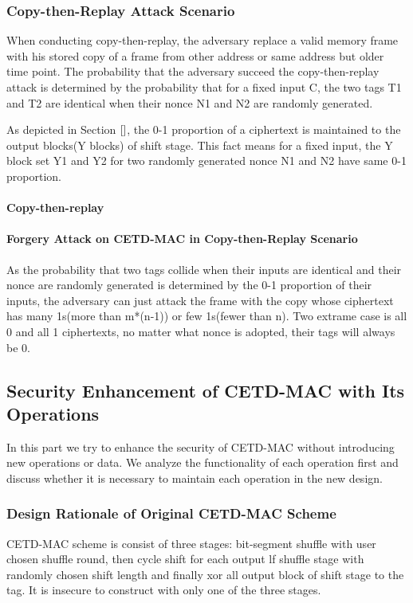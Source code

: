 \subsubsection{Copy-then-Replay Attack Scenario}
When conducting copy-then-replay, the adversary replace a valid memory frame with his stored copy of a frame from other address or same address but older time point. The probability that the adversary succeed the copy-then-replay attack is determined by the probability that for a fixed input C, the two tags T1 and T2 are identical when their nonce N1 and N2 are randomly generated.

As depicted in Section $\ref{}$, the 0-1 proportion of a ciphertext is maintained to the output blocks(Y blocks) of shift stage. This fact means for a fixed input, the Y block set Y1 and Y2 for two randomly generated nonce N1 and N2 have same 0-1 proportion.  
\paragraph{Copy-then-replay}
\paragraph{Forgery Attack on CETD-MAC in Copy-then-Replay Scenario}
As the probability that two tags collide when their inputs are identical and their nonce are randomly generated is determined by the 0-1 proportion of their inputs, the adversary can just attack the frame with the copy whose ciphertext has many 1s(more than m*(n-1)) or few 1s(fewer than n). Two extrame case is all 0 and all 1 ciphertexts, no matter what nonce is adopted, their tags will always be 0.

\subsection{Security Enhancement of CETD-MAC with Its Operations}
In this part we try to enhance the security of CETD-MAC without introducing new operations or data. We analyze the functionality of each operation first and discuss whether it is necessary to maintain each operation in the new design.
\subsubsection{Design Rationale of Original CETD-MAC Scheme}
CETD-MAC scheme is consist of three stages: bit-segment shuffle with user chosen shuffle round, then cycle shift for each output lf shuffle stage with randomly chosen shift length and finally xor all output block of shift stage to the tag. It is insecure to construct with only one of the three stages.
